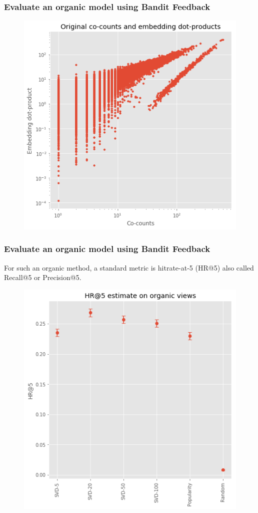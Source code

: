 \begin{frame}
  \frametitle{Evaluate an organic model using Bandit Feedback}
\begin{figure}[h!]
\includegraphics[scale=0.4]{images/evalorganicwithbandit1.png}
\centering
\label{motex1}
\end{figure}
\end{frame}


\begin{frame}
  \frametitle{Evaluate an organic model using Bandit Feedback}

  For such an organic method, a standard metric is hitrate-at-5 (HR@5) also called Recall@5 or Precision@5.
\begin{figure}[h!]
\includegraphics[scale=0.4]{images/evalorganicwithbandit2.png}
\centering
\label{motex1}
\end{figure}
\end{frame}

